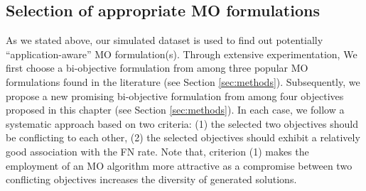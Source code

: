 \subsection{Selection of appropriate MO formulations}
\label{sec:selection_msa_formulation}
As we stated above, our simulated dataset is used to find out potentially ``application-aware'' MO formulation(s). Through extensive experimentation, We first choose a bi-objective formulation from among three popular MO formulations found in the literature (see Section \ref{sec:methods}). Subsequently, we propose a new promising bi-objective formulation from among four objectives proposed in this chapter (see Section \ref{sec:methods}). In each case, we follow a systematic approach based on two criteria: (1) the selected two objectives should be conflicting to each other, (2) the selected objectives should exhibit a relatively good association with the FN rate. Note that, criterion (1) makes the employment of an MO algorithm more attractive as a compromise between two conflicting objectives increases the diversity of generated solutions. 

